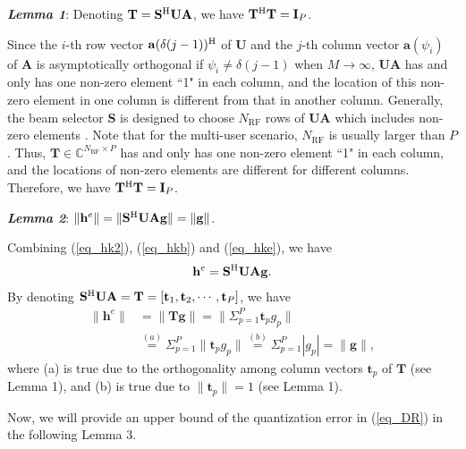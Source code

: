 \documentclass[10pt,twocolumn,twoside]{IEEEtran}
\begin{document}
\textit{\textbf{Lemma 1}}: Denoting $\mathbf{T}=\mathbf{S}^{\rm{H}}\mathbf{U}\mathbf{A}$, we have $\mathbf{T}^{\rm{H}}\mathbf{T}=\mathbf{I}_P$.
\begin{IEEEproof}
Since the $i$-th row vector $\mathbf{a}(\delta (j-1))^{\rm{H}}$ of $\mathbf{U}$ and the $j$-th column vector $\mathbf{a}(\psi_{i})$ of $\mathbf{A}$ is asymptotically orthogonal if $\psi_{i}\neq \delta (j-1)$ when $M\rightarrow\infty$,
$\mathbf{U}\mathbf{A}$ has and only has one non-zero element ``1" in each column, and the location of this non-zero element in one column is different from that in another column.
Generally, the beam selector $\mathbf{S}$ is designed to choose $N_\text{RF}$ rows of $\mathbf{U}\mathbf{A}$ which includes non-zero elements \cite{CL_XGao_BeamSelection}. Note that for the multi-user scenario, $N_\text{RF}$ is usually larger than $P$. 
Thus, $\mathbf{T}\in\mathbb{C}^{N_\text{RF}\times P}$ has and only has one non-zero element ``1" in each column, and the locations of non-zero elements are different for different columns.
Therefore, we have $\mathbf{T}^{\rm{H}}\mathbf{T}=\mathbf{I}_P$.
\end{IEEEproof}

\textit{\textbf{Lemma 2}}: $\|\mathbf{h}^e\|=\|\mathbf{S}^{\rm{H}}\mathbf{U}\mathbf{A}\mathbf{g}\|=\|\mathbf{g}\|$.
\begin{IEEEproof}
Combining (\ref{eq_hk2}), (\ref{eq_hkb}) and (\ref{eq_hke}), we have
\begin{align}\label{eq_e}
\mathbf{h}^e=\mathbf{S}^{\rm{H}}\mathbf{U}\mathbf{A}\mathbf{g}.
\end{align}
By denoting $\mathbf{S}^{\rm{H}}\mathbf{U}\mathbf{A}=\mathbf{T}=[\mathbf{t}_1,\mathbf{t}_2,\cdots,\mathbf{t}_P]$, we have
\begin{align} \label{eq_ci_norm}
\|\mathbf{h}^e\|&=\|\mathbf{T}\mathbf{g}\|=\|\Sigma_{p=1}^P\mathbf{t}_pg_{p}\| \\\nonumber
&\overset{(a)}{=}\Sigma_{p=1}^P\|\mathbf{t}_pg_{p}\| \overset{(b)}{=}\Sigma_{p=1}^P|g_{p}|=\|\mathbf{g}\|,
\end{align}
where (a) is true due to the orthogonality among column vectors $\mathbf{t}_p$ of $\mathbf{T}$ (see Lemma 1), and (b) is true due to $\|\mathbf{t}_p\|=1$ (see Lemma 1).
\end{IEEEproof}
Now, we will provide an upper bound of the quantization error in (\ref{eq_DR}) in the following Lemma 3.
\end{document}
